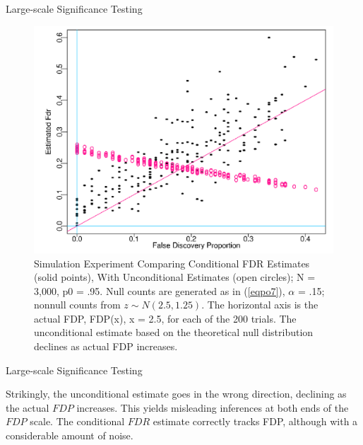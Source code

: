 \documentclass{beamer}
\begin{document}
\begin{frame}[t]{Large-scale Significance Testing}\vspace{10pt}
\begin{figure}[h]
	\centering
	\includegraphics[scale=0.35]{efron2007figure4}
	\caption{\footnotesize{Simulation Experiment Comparing Conditional FDR Estimates (solid points), With Unconditional Estimates (open circles); N = 3,000, p0 = .95. Null counts are generated as in (\ref{eqpo7}), $\alpha$ = .15; nonnull counts from $z \sim N(2.5, 1.25)$. The horizontal axis is the actual FDP, FDP(x), x = 2.5, for each of the 200 trials. The unconditional estimate based on the theoretical null distribution declines as actual FDP increases.}}
	\label{fig4}
\end{figure}

\end{frame}


\begin{frame}[t]{Large-scale Significance Testing}\vspace{10pt}

Strikingly, the unconditional estimate goes in the wrong direction, declining as the actual $FDP$ increases. This yields misleading inferences at both ends of the $FDP$ scale. The conditional $FDR$ estimate correctly tracks FDP, although with a considerable amount of noise.

\end{frame}
\end{document}
